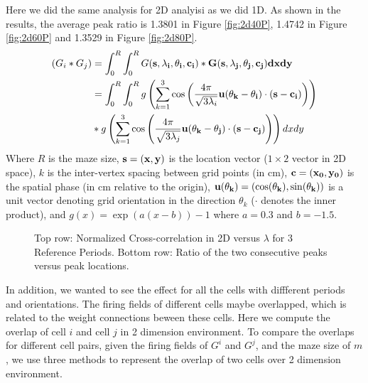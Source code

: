 \documentclass[11pt, letterpaper, onecolumn]{article}
\begin{document}
Here we did the same analysis for 2D analyisi as we did 1D. As shown in the results, the average peak ratio is 1.3801 in Figure \ref{fig:2d40P}, 1.4742 in Figure \ref{fig:2d60P} and 1.3529 in Figure \ref{fig:2d80P}. 
\begin{equation}
\begin{split}
    (G_i * G_j)
    & = \int_{0}^{R}\int_{0}^{R} G(\bf{s}, \lambda_i, \theta_i, \bf{c}_i) * G(\bf{s}, \lambda_j, \theta_j, \bf{c}_j) dxdy \\
   & = \int_{0}^{R}\int_{0}^{R} g\left(\sum_{k=1}^{3} \cos\left(\frac{4\pi}{\sqrt{3\lambda_i}}\bf{u}(\theta_{k}-\theta_i)\cdot(\bf{s}-\bf{c_i})\right)\right) \\
   & * g\left(\sum_{k=1}^{3} \cos\left(\frac{4\pi}{\sqrt{3\lambda_j}}\bf{u}(\theta_{k}-\theta_j)\cdot(\bf{s}-\bf{c_j})\right)\right) dxdy \\
\end{split}
\end{equation}
Where $R$ is the maze size, $ \bf{s}=(x,y)$ is the location vector ($1\times 2$ vector in 2D space), $ k $ is the inter-vertex spacing between grid points (in cm), $ \bf{c} = (x_{0},y_{0}) $ is the spatial phase (in cm relative to the origin), $ \bf{u}(\theta_{k})=(\cos(\theta_{k}), \sin(\theta_{k}))$ is a unit vector denoting grid orientation in the direction $ \theta_{k} $ ($\cdot$ denotes the inner product), and $ g(x) = \exp(a(x-b))-1 $ where $ a=0.3 $ and $ b=-1.5 $. 

\begin{figure}[!htbp]
\centering
{}
\caption{Top row: Normalized Cross-correlation in 2D versus $ \lambda $ for 3 Reference Periods. Bottom row: Ratio of the two consecutive peaks versus peak locations.}
\label{fig:2d}
\end{figure}

In addition, we wanted to see the effect for all the cells with diffferent periods and orientations. The firing fields of different cells maybe overlapped, which is related to the weight connections beween these cells. Here we compute the overlap of cell $i$ and cell $j$ in 2 dimension environment. To compare the overlaps for different cell pairs, given the firing fields of $G^i$ and $G^j$, and the maze size of $m$, we use three methods to represent the overlap of two cells over 2 dimension environment.
\end{document}
